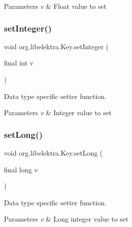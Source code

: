 \begin{DoxyParams}{Parameters}
{\em v} & Float value to set \\
\hline
\end{DoxyParams}
\mbox{\label{classorg_1_1libelektra_1_1Key_a290d278b4c11ea4bcabf82c0c97e6350}} 
\subsubsection{\texorpdfstring{setInteger()}{setInteger()}}
{\footnotesize\ttfamily void org.\+libelektra.\+Key.\+set\+Integer (\begin{DoxyParamCaption}\item[{final int}]{v }\end{DoxyParamCaption})\hspace{0.3cm}{\ttfamily [inline]}}



Data type specific setter function. 


\begin{DoxyParams}{Parameters}
{\em v} & Integer value to set \\
\hline
\end{DoxyParams}
\mbox{\label{classorg_1_1libelektra_1_1Key_ac02de55fc0a3eb10372de7fa146db937}} 
\subsubsection{\texorpdfstring{setLong()}{setLong()}}
{\footnotesize\ttfamily void org.\+libelektra.\+Key.\+set\+Long (\begin{DoxyParamCaption}\item[{final long}]{v }\end{DoxyParamCaption})\hspace{0.3cm}{\ttfamily [inline]}}



Data type specific setter function. 


\begin{DoxyParams}{Parameters}
{\em v} & Long integer value to set \\
\hline
\end{DoxyParams}
\mbox{\label{classorg_1_1libelektra_1_1Key_ac8c73ca3d16cf4454bd326ebe469cf2d}} 
